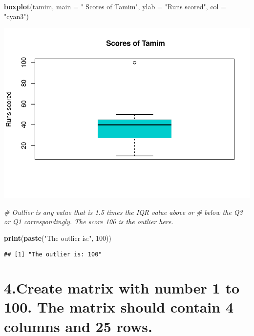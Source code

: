 \documentclass[]{article}
\newenvironment{Shaded}{\begin{snugshade}}{\end{snugshade}}
\newcommand{\CommentTok}[1]{\textcolor[rgb]{0.56,0.35,0.01}{\textit{#1}}}
\newcommand{\DataTypeTok}[1]{\textcolor[rgb]{0.13,0.29,0.53}{#1}}
\newcommand{\DecValTok}[1]{\textcolor[rgb]{0.00,0.00,0.81}{#1}}
\newcommand{\KeywordTok}[1]{\textcolor[rgb]{0.13,0.29,0.53}{\textbf{#1}}}
\newcommand{\NormalTok}[1]{#1}
\newcommand{\StringTok}[1]{\textcolor[rgb]{0.31,0.60,0.02}{#1}}
\begin{document}
\begin{Shaded}
\begin{Highlighting}[]
\KeywordTok{boxplot}\NormalTok{(tamim, }\DataTypeTok{main =} \StringTok{" Scores of Tamim"}\NormalTok{, }\DataTypeTok{ylab =} \StringTok{"Runs scored"}\NormalTok{, }\DataTypeTok{col =} \StringTok{"cyan3"}\NormalTok{)}
\end{Highlighting}
\end{Shaded}

\includegraphics{Day_5_files/figure-latex/unnamed-chunk-4-1.pdf}

\begin{Shaded}
\begin{Highlighting}[]
\CommentTok{# Outlier is any value that is 1.5 times the IQR value above or }
\CommentTok{# below the Q3 or Q1 correspondingly. The score 100 is the outlier here.}

\KeywordTok{print}\NormalTok{(}\KeywordTok{paste}\NormalTok{(}\StringTok{"The outlier is:"}\NormalTok{, }\DecValTok{100}\NormalTok{))}
\end{Highlighting}
\end{Shaded}

\begin{verbatim}
## [1] "The outlier is: 100"
\end{verbatim}

\hypertarget{create-matrix-with-number-1-to-100.-the-matrix-should-contain-4-columns-and-25-rows.}{%
\section{4.Create matrix with number 1 to 100. The matrix should contain
4 columns and 25
rows.}\label{create-matrix-with-number-1-to-100.-the-matrix-should-contain-4-columns-and-25-rows.}}
\end{document}

